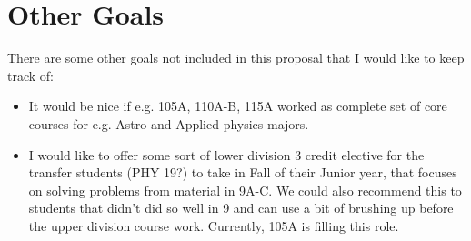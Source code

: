 \documentclass[12pt]{article}
\begin{document}
\section{Other Goals}
There are some other goals not included in this proposal that I would like to keep track of:
\begin{itemize}
\item It would be nice if e.g. 105A, 110A-B, 115A worked as complete set of core courses for e.g. Astro and Applied physics majors. 
\item I would like to offer some sort of lower division 3 credit elective for the transfer students (PHY 19?) to take in Fall of their Junior year, that focuses on solving problems from material in 9A-C.  We could also recommend this to students that didn't did so well in 9 and can use a bit of brushing up before the upper division course work.  Currently, 105A is filling this role.
\end{itemize}
\end{document}
